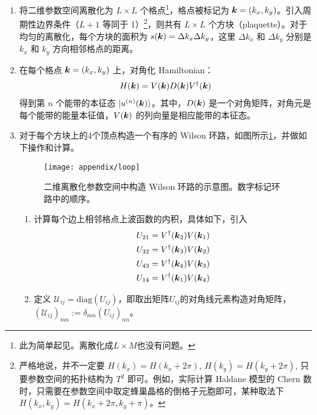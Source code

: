 \begin{enumerate}

\item 将二维参数空间离散化为 $L\times L$ 个格点\footnote{此为简单起见。离散化成$L\times M$也没有问题。}，格点被标记为 $\boldsymbol{k}=(k_x, k_y)$。引入周期性边界条件（$L+1$ 等同于 1）\footnote{严格地说，并不一定要 $H(k_x)=H(k_x+2\pi)$, $H(k_y)=H(k_y+2\pi)$, 只要参数空间的拓扑结构为 $T^2$ 即可。例如，实际计算 Haldane 模型的 Chern 数时，只需要在参数空间中取定蜂巢晶格的倒格子元胞即可，某种取法下 $H(k_x, k_y) = H(k_x + 2\pi, k_y + \pi)$。}，则共有 $L\times L$ 个方块（plaquette）。对于均匀的离散化，每个方块的面积为 $s(\boldsymbol{k})=\Delta k_x\Delta k_y$，这里 $\Delta k_x$ 和 $\Delta k_y$ 分别是 $k_x$ 和 $k_y$ 方向相邻格点的距离。

\item 在每个格点 $\boldsymbol{k}=(k_x, k_y)$ 上，对角化 Hamiltonian：
\begin{align}
H(\boldsymbol{k}) = V(\boldsymbol{k})D(\boldsymbol{k})V^{\dagger}(\boldsymbol{k})
\end{align}
得到第 $n$ 个能带的本征态 $|u^{(n)}(\boldsymbol{k})\rangle$。其中，$D(\boldsymbol{k})$ 是一个对角矩阵，对角元是每个能带的能量本征值，$V(\boldsymbol{k})$ 的列向量是相应能带的本征态。

\item 对于每个方块上的4个顶点构造一个有序的 Wilson 环路，如图所示\ref{fig:topoml-appendix}，并做如下操作和计算。
\begin{figure}
\centering
\texttt{[image: appendix/loop]}
\caption{二维离散化参数空间中构造 Wilson 环路的示意图。数字标记环路中的顺序。}\label{fig:topoml-appendix}
\end{figure}

\begin{enumerate}

\item 计算每个边上相邻格点上波函数的内积，具体如下，引入
\begin{align}
U_{21} &= V^{\dagger}(\boldsymbol{k}_2) V(\boldsymbol{k}_1) \\ 
U_{32} &= V^{\dagger}(\boldsymbol{k}_3) V(\boldsymbol{k}_2) \\ 
U_{43} &= V^{\dagger}(\boldsymbol{k}_4) V(\boldsymbol{k}_3) \\ 
U_{14} &= V^{\dagger}(\boldsymbol{k}_1) V(\boldsymbol{k}_4) 
\end{align}

\item 定义 $\mathcal{U}_{ij} = \text{diag}(U_{ij})$，即取出矩阵$U_{ij}$的对角线元素构造对角矩阵，$(\mathcal{U}_{ij})_{mn}:=\delta_{mn}(U_{ij})_{nn}$。


\end{enumerate}
\end{enumerate}

